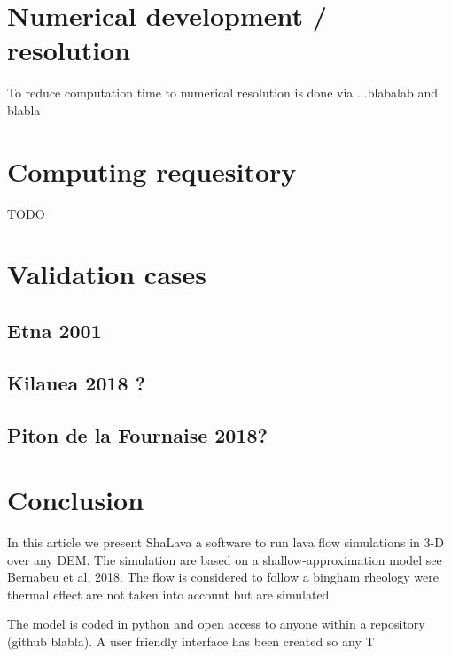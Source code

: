 \documentclass[11pt,a4paper]{article}
\begin{document}
\section{Numerical development / resolution }
To reduce computation time to numerical resolution is done via ...blabalab
and blabla
\section{Computing requesitory}

TODO

\section{Validation cases}
\subsection{Etna 2001}
\subsection{Kilauea 2018 ?}
\subsection{Piton de la Fournaise 2018?}

\section{Conclusion}
In this article we present ShaLava a software to run lava flow simulations in 3-D over any DEM. The simulation are based on a shallow-approximation model see Bernabeu et al, 2018. The flow is considered to follow a bingham rheology were thermal effect are not taken into account but are simulated

The model is coded in python and open access to anyone within a repository (github blabla).
A user friendly interface has been created so any
T
\end{document}

